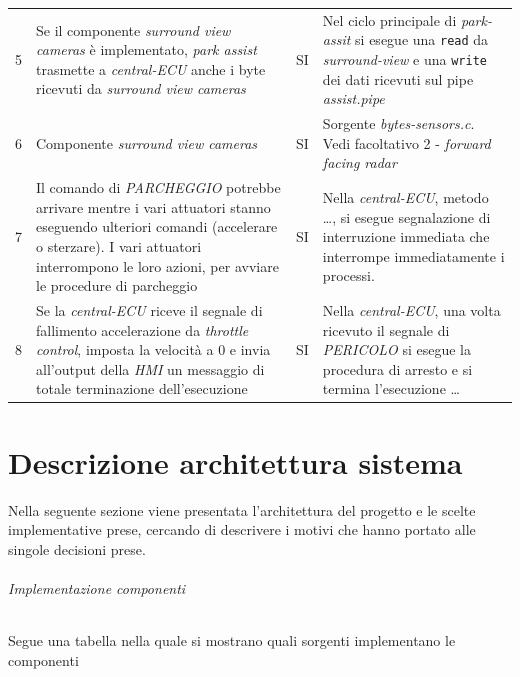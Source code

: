 \documentclass[11pt, openany]{article}
\theoremstyle{definition}
\theoremstyle{plain}
\theoremstyle{remark}
\begin{document}
\begin{tcolorbox}[width=\textwidth,colback={Cornsilk2}]
\begin{tabularx}{\textwidth}{lXcX}
					5	&	Se il componente \textit{surround view cameras} è implementato, \textit{park assist} trasmette a \textit{central-ECU} anche i byte ricevuti da \textit{surround view cameras}	&	SI	&	Nel ciclo principale di \textit{park-assit} si esegue una \texttt{read} da \textit{surround-view} e una \texttt{write} dei dati ricevuti sul pipe \textit{assist.pipe} \\\vspace{0.1cm}
					6	&	Componente \textit{surround view cameras}	&	SI	&	Sorgente \textit{bytes-sensors.c}. Vedi facoltativo 2 - \textit{forward facing radar}	\\\vspace{0.1cm}
					7	&	Il comando di \textit{PARCHEGGIO} potrebbe arrivare mentre i vari attuatori stanno eseguendo ulteriori comandi (accelerare o sterzare). I vari attuatori interrompono le loro azioni, per avviare le procedure di parcheggio	&	SI	&	Nella \textit{central-ECU}, metodo \dots, si esegue segnalazione di interruzione immediata che interrompe immediatamente i processi.\\
					8	&	Se la \textit{central-ECU }riceve il segnale di fallimento accelerazione da \textit{throttle control}, imposta la velocità a 0 e invia all'output della \textit{HMI} un messaggio di totale terminazione dell'esecuzione	&	SI	&	Nella \textit{central-ECU}, una volta ricevuto il segnale di \textit{PERICOLO} si esegue la procedura di arresto e si termina l'esecuzione \dots
				\end{tabularx}
				\label{tab:facoltativi}
			\end{tcolorbox}

	\part{Descrizione architettura sistema}
		Nella seguente sezione viene presentata l'architettura del progetto e le scelte implementative prese, cercando di descrivere i motivi che hanno portato alle singole decisioni prese.

		\paragraph{Implementazione componenti}
			\footnotesize Segue una tabella nella quale si mostrano quali sorgenti implementano le componenti
			\normalsize
\end{document}
